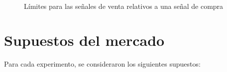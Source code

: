 \documentclass[12pt]{scrbook}
\theoremstyle{break}
\theoremstyle{break}
\begin{document}
\begin{figure}[ht]
\centering
{}
\caption{\label{imagen:bandas horizontales} Límites para las señales de venta relativos a una señal de compra}
\end{figure}

\section{Supuestos del mercado}
\label{sec:supuestos del mercado}
Para cada experimento, se consideraron los siguientes supuestos:
\end{document}
